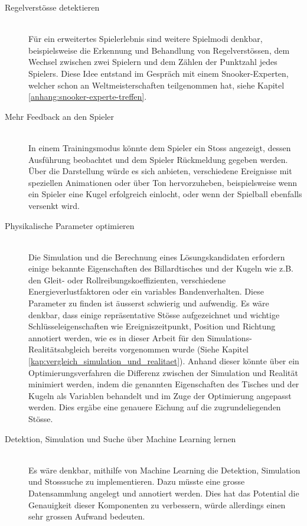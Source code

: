 \begin{description}
    \item[Regelverstösse detektieren]\mbox{} \\
    Für ein erweitertes Spielerlebnis sind weitere Spielmodi denkbar, beispielsweise die Erkennung und Behandlung von
    Regelverstössen, dem Wechsel zwischen zwei Spielern und dem Zählen der Punktzahl jedes Spielers.
    Diese Idee entstand im Gespräch mit einem Snooker-Experten, welcher schon an Weltmeisterschaften teilgenommen hat, siehe Kapitel \ref{anhang:snooker-experte-treffen}.
    \item[Mehr Feedback an den Spieler]\mbox{} \\
    In einem Trainingsmodus könnte dem Spieler ein Stoss angezeigt, dessen Ausführung beobachtet und dem Spieler
    Rückmeldung gegeben werden.
    Über die Darstellung würde es sich anbieten, verschiedene Ereignisse mit speziellen Animationen oder über Ton hervorzuheben,
    beispielsweise wenn ein Spieler eine Kugel erfolgreich einlocht, oder wenn der Spielball ebenfalls versenkt wird.
    \item[Physikalische Parameter optimieren]\mbox{} \\
    Die Simulation und die Berechnung eines Lösungskandidaten erfordern einige bekannte Eigenschaften des Billardtisches und
    der Kugeln wie z.B. den Gleit- oder Rollreibungskoeffizienten, verschiedene Energieverlustfaktoren oder ein variables
    Bandenverhalten. Diese Parameter zu finden ist äusserst schwierig und aufwendig. Es wäre denkbar, dass einige repräsentative
    Stösse aufgezeichnet und wichtige Schlüsseleigenschaften wie Ereigniszeitpunkt, Position und Richtung annotiert werden,
    wie es in dieser Arbeit für den Simulations- Realitätsabgleich bereits vorgenommen
    wurde (Siehe Kapitel \ref{kap:vergleich_simulation_und_realitaet}). Anhand dieser könnte über ein Optimierungsverfahren
    die Differenz zwischen der Simulation und Realität minimiert werden, indem die genannten Eigenschaften des Tisches und
    der Kugeln als Variablen behandelt und im Zuge der Optimierung angepasst werden. Dies ergäbe eine genauere Eichung auf
    die zugrundeliegenden Stösse.
    \item[Detektion, Simulation und Suche über Machine Learning lernen]\mbox{} \\
    Es wäre denkbar, mithilfe von Machine Learning die Detektion, Simulation und Stosssuche zu implementieren.
    Dazu müsste eine grosse Datensammlung angelegt und annotiert werden.
    Dies hat das Potential die Genauigkeit dieser Komponenten zu verbessern, würde allerdings einen sehr grossen Aufwand bedeuten.
\end{description}
